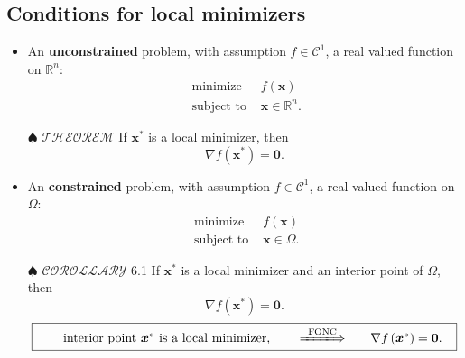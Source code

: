\documentclass[12pt,thmsa]{article}
\begin{document}
\subsection{Conditions for local minimizers}
\begin{itemize}
	\item An \textbf{unconstrained} problem, with assumption \(f \in \mathcal{C}^{1}\), a real valued function on \( \mathbb{R}^{n}\):
	\[
	\begin{aligned}
		\text { minimize }   & f(\boldsymbol{x}) \\
		\text { subject to } & \boldsymbol{x} \in \mathbb{R}^{n} .
	\end{aligned}
	\]
	
	\item[\(\spadesuit\)] \(\mathscr{THEOREM}\) If \(\boldsymbol{x}^{*}\) is a local minimizer, then
	\[
	\nabla f\left(\boldsymbol{x}^{*}\right)=\mathbf{0} .
	\]
	
	\item An \textbf{constrained} problem, with assumption \(f \in \mathcal{C}^{1}\), a real valued function on \( \Omega \):
	\[
	\begin{aligned}
		\text { minimize }   & f(\boldsymbol{x}) \\
		\text { subject to } & \boldsymbol{x} \in \Omega .
	\end{aligned}
	\]

	\item[\(\spadesuit\)] \(\mathscr{COROLLARY}\) 6.1 If \(\boldsymbol{x}^{*}\) is a local minimizer and an interior point of \(\Omega\), then
	\[
	\nabla f\left(\boldsymbol{x}^{*}\right)=\mathbf{0} .
	\]
	\[ \fbox{\vspace{1em}\hspace{1em}
		\(\begin{array}{ccccc}
			\text{ interior point } \boldsymbol{x}^* \text{ is a local minimizer, } & & \xLongrightarrow{\text{ FONC }} & & \nabla f\left(\boldsymbol{x}^{*}\right)=\mathbf{0}.
		\end{array}
		\)
	}
	\]
	
\end{itemize}
\end{document}
